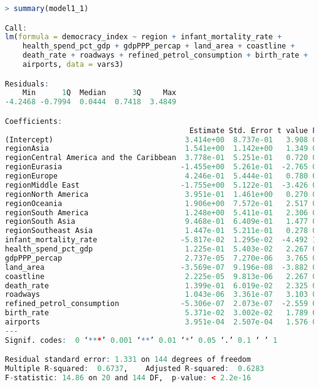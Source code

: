 \begin{lstlisting}[language=R, caption=Result of the model]
> summary(model1_1)

Call:
lm(formula = democracy_index ~ region + infant_mortality_rate + 
    health_spend_pct_gdp + gdpPPP_percap + land_area + coastline + 
    death_rate + roadways + refined_petrol_consumption + birth_rate + 
    airports, data = vars3)

Residuals:
    Min      1Q  Median      3Q     Max 
-4.2468 -0.7994  0.0444  0.7418  3.4849 

Coefficients:
                                          Estimate Std. Error t value Pr(>|t|)    
(Intercept)                              3.414e+00  8.737e-01   3.908 0.000143 ***
regionAsia                               1.541e+00  1.142e+00   1.349 0.179418    
regionCentral America and the Caribbean  3.778e-01  5.251e-01   0.720 0.472961    
regionEurasia                           -1.455e+00  5.261e-01  -2.765 0.006429 ** 
regionEurope                             4.246e-01  5.444e-01   0.780 0.436737    
regionMiddle East                       -1.755e+00  5.122e-01  -3.426 0.000798 ***
regionNorth America                      3.951e-01  1.461e+00   0.270 0.787167    
regionOceania                            1.906e+00  7.572e-01   2.517 0.012926 *  
regionSouth America                      1.248e+00  5.411e-01   2.306 0.022545 *  
regionSouth Asia                         9.468e-01  6.409e-01   1.477 0.141768    
regionSoutheast Asia                     1.447e-01  5.211e-01   0.278 0.781654    
infant_mortality_rate                   -5.817e-02  1.295e-02  -4.492 1.44e-05 ***
health_spend_pct_gdp                     1.225e-01  5.403e-02   2.267 0.024901 *  
gdpPPP_percap                            2.737e-05  7.270e-06   3.765 0.000242 ***
land_area                               -3.569e-07  9.196e-08  -3.882 0.000157 ***
coastline                                2.225e-05  9.813e-06   2.267 0.024882 *  
death_rate                               1.399e-01  6.019e-02   2.325 0.021477 *  
roadways                                 1.043e-06  3.361e-07   3.103 0.002305 ** 
refined_petrol_consumption              -5.306e-07  2.073e-07  -2.559 0.011516 *  
birth_rate                               5.371e-02  3.002e-02   1.789 0.075709 .  
airports                                 3.951e-04  2.507e-04   1.576 0.117142    
---
Signif. codes:  0 ‘***’ 0.001 ‘**’ 0.01 ‘*’ 0.05 ‘.’ 0.1 ‘ ’ 1

Residual standard error: 1.331 on 144 degrees of freedom
Multiple R-squared:  0.6737,	Adjusted R-squared:  0.6283 
F-statistic: 14.86 on 20 and 144 DF,  p-value: < 2.2e-16
\end{lstlisting}

